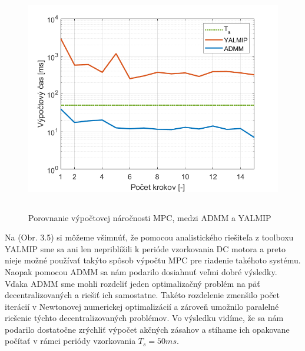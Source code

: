 \newpage
\begin{figure}[H]	
	\centering
	\includegraphics[width=13cm,height=10cm]{images/DC_motor/Vypoctovy_cas}
	\caption{Porovnanie výpočtovej náročnosti MPC, medzi ADMM a YALMIP}
	\label{fig9: VN}
\end{figure}
Na (Obr. 3.5) si môžeme všimnúť, že pomocou analistického riešiteľa z toolboxu YALMIP sme sa ani len nepriblížili k perióde vzorkovania DC motora a preto nieje možné používať takýto spôsob výpočtu MPC pre riadenie takéhoto systému. Naopak pomocou ADMM sa nám podarilo dosiahnuť veľmi dobré výsledky. Vďaka ADMM sme mohli rozdeliť jeden optimalizačný problém na päť decentralizovaných a riešiť ich samostatne. Takéto rozdelenie zmenšilo počet iterácií v Newtonovej numerickej optimalizácií a zároveň umožnilo paralelné riešenie týchto decentralizovaných problémov. Vo výsledku vidíme, že sa nám podarilo dostatočne zrýchliť výpočet akčných zásahov a stíhame ich opakovane počítať v rámci periódy vzorkovania $T_{s} = 50ms$.